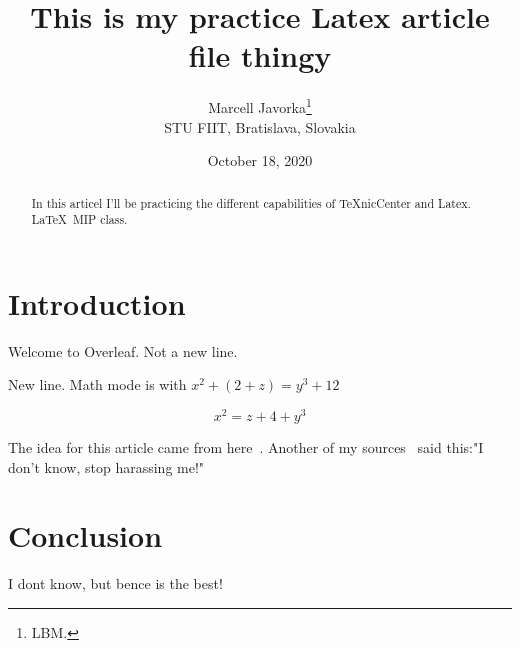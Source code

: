 \documentclass{article}%
\begin{document}
\title{This is my practice Latex article file thingy}
\author{Marcell Javorka\thanks{LBM.}
\\STU FIIT, Bratislava, Slovakia}
\date{October 18, 2020}
\maketitle

\begin{abstract}
In this articel I'll be practicing the different capabilities of TeXnicCenter and Latex.
\LaTeX\ MIP class.
\end{abstract}

\section{Introduction}
Welcome to Overleaf.
Not a new line.

New line. Math mode is with $x^2 + (2+z) = y^3+12$

$$x^2=z+4+y^3$$

The idea for this article came from here~\cite{howard2017any}.
\newline
Another of my sources~\cite{ahmad2016technology} said this:"I don't know, stop harassing me!"


\section{Conclusion}
I dont know, but bence is the best!




\end{document}

